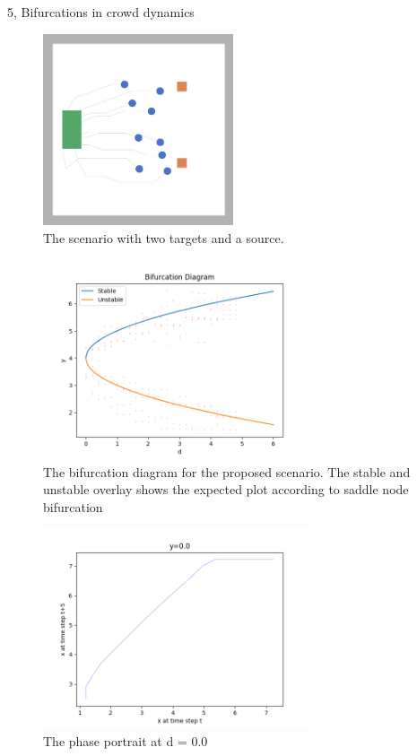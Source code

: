\documentclass[10pt,a4paper]{article}
\begin{document}
\begin{task}{5, Bifurcations in crowd dynamics}
\begin{figure}[H]
    \centering
    \includegraphics[width=0.5\textwidth]{./pictures/task5_2.jpeg}
    \caption{The scenario with two targets and a source.}
    \label{fig:task5_2}
\end{figure}

\begin{figure}[H]
    \centering
    \includegraphics[width=0.7\textwidth]{../plots/task5/saddle_bifurcation.png}
    \caption{The bifurcation diagram for the proposed scenario. The stable and unstable overlay shows the expected plot according to saddle node bifurcation}
    \label{fig:part2_bifurcation}
\end{figure}

\begin{figure}[H]
    \centering
    \includegraphics[width=0.7\textwidth]{../plots/task5/0_phase_portrait_y_0_0_second_part.png}
    \caption{The phase portrait at d = 0.0}
    \label{fig:part2_bifurcation}
\end{figure}


\end{task}
\end{document}
